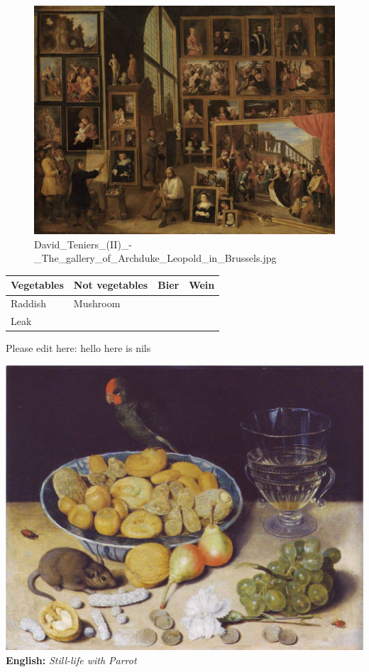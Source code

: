 \documentclass[
  letterpaper,
]{book}
\begin{document}
\begin{figure}

{\centering \includegraphics{./6780765/David_Teniers_(II)_-_The_gallery_of_Archduke_Leopold_in_Brussels.jpg}

}

\caption{David\_Teniers\_(II)\_-\_The\_gallery\_of\_Archduke\_Leopold\_in\_Brussels.jpg}

\end{figure}

\begin{longtable}[]{@{}llll@{}}
\toprule()
Vegetables & Not vegetables & Bier & Wein \\
\midrule()
\endhead
Raddish & Mushroom & & \\
Leak & & & \\
\bottomrule()
\end{longtable}

Please edit here: hello here is nils

\includegraphics{./6780765/Papagei.jpg}\\
\textbf{English:} \emph{Still-life with Parrot}
\end{document}
